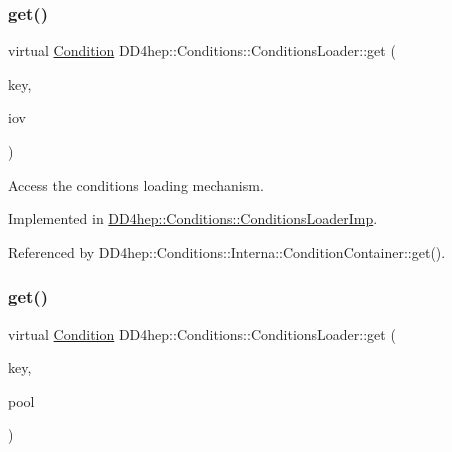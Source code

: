 \subsubsection{\texorpdfstring{get()}{get()}\hspace{0.1cm}{\footnotesize\ttfamily [1/2]}}
{\footnotesize\ttfamily virtual \hyperlink{class_d_d4hep_1_1_conditions_1_1_condition}{Condition} D\+D4hep\+::\+Conditions\+::\+Conditions\+Loader\+::get (\begin{DoxyParamCaption}\item[{\hyperlink{class_d_d4hep_1_1_conditions_1_1_conditions_loader_ac77fe60ee60373d61aed19b200949c93}{key\+\_\+type}}]{key,  }\item[{const \hyperlink{class_d_d4hep_1_1_conditions_1_1_conditions_loader_a5647851492a3b1469208473fe6d96329}{iov\+\_\+type} \&}]{iov }\end{DoxyParamCaption})\hspace{0.3cm}{\ttfamily [pure virtual]}}



Access the conditions loading mechanism. 



Implemented in \hyperlink{class_d_d4hep_1_1_conditions_1_1_conditions_loader_imp_a0144aac3062bb704dd2c9557bed207da}{D\+D4hep\+::\+Conditions\+::\+Conditions\+Loader\+Imp}.



Referenced by D\+D4hep\+::\+Conditions\+::\+Interna\+::\+Condition\+Container\+::get().

\hypertarget{class_d_d4hep_1_1_conditions_1_1_conditions_loader_a9d8cacc0e3520074b386d157906a376f}{}\label{class_d_d4hep_1_1_conditions_1_1_conditions_loader_a9d8cacc0e3520074b386d157906a376f} 
\subsubsection{\texorpdfstring{get()}{get()}\hspace{0.1cm}{\footnotesize\ttfamily [2/2]}}
{\footnotesize\ttfamily virtual \hyperlink{class_d_d4hep_1_1_conditions_1_1_condition}{Condition} D\+D4hep\+::\+Conditions\+::\+Conditions\+Loader\+::get (\begin{DoxyParamCaption}\item[{\hyperlink{class_d_d4hep_1_1_conditions_1_1_conditions_loader_ac77fe60ee60373d61aed19b200949c93}{key\+\_\+type}}]{key,  }\item[{const \hyperlink{class_d_d4hep_1_1_conditions_1_1_user_pool}{User\+Pool} \&}]{pool }\end{DoxyParamCaption})\hspace{0.3cm}{\ttfamily [pure virtual]}}



